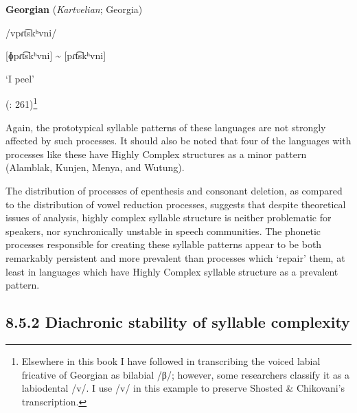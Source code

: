 \ea\label{ex:(8.8)}
  \textbf{Georgian} (\textit{Kartvelian}; Georgia)

/vpɾt͡skʰvni/

[ɸpɾt͡skʰvni] {\textasciitilde} [pɾt͡skʰvni]

‘I peel’

(\citealt{ShostedChikovani2006}: 261)\footnote{ \textrm{Elsewhere in this book I have followed \citet{Aronson1991} in transcribing the voiced labial fricative of Georgian as bilabial /β/; however, some researchers classify it as a labiodental /v/. I use /v/ in this example to preserve Shosted \& Chikovani’s transcription.}}
\z

Again, the prototypical syllable patterns of these languages are not strongly affected by such processes. It should also be noted that four of the languages with processes like these have Highly Complex structures as a minor pattern (Alamblak, Kunjen, Menya, and Wutung).

  The distribution of processes of epenthesis and consonant deletion, as compared to the distribution of vowel reduction processes, suggests that despite theoretical issues of analysis, highly complex syllable structure is neither problematic for speakers, nor synchronically unstable in speech communities. The phonetic processes responsible for creating these syllable patterns appear to be both remarkably persistent and more prevalent than processes which ‘repair’ them, at least in languages which have Highly Complex syllable structure as a prevalent pattern.

\subsection{8.5.2 Diachronic stability of syllable complexity}

